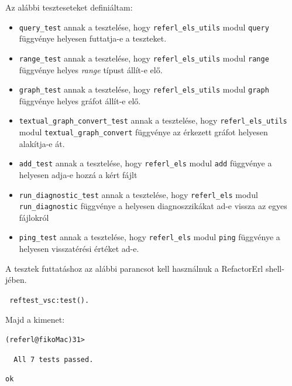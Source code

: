 \noindent Az alábbi teszteseteket definiáltam:

\begin{itemize}
    \item \lstinline{query_test} annak a tesztelése, hogy \lstinline{referl_els_utils} modul \lstinline{query} függvénye helyesen futtatja-e a teszteket.
    
    \item \lstinline{range_test} annak a tesztelése, hogy \lstinline{referl_els_utils} modul \lstinline{range} függvénye helyes \textit{range} típust állít-e elő.
    
    \item \lstinline{graph_test} annak a tesztelése, hogy \lstinline{referl_els_utils} modul \lstinline{graph} függvénye helyes gráfot állít-e elő.
    
    \item \lstinline{textual_graph_convert_test} annak a tesztelése, hogy \lstinline{referl_els_utils} modul \lstinline{textual_graph_convert} függvénye az érkezett gráfot helyesen alakítja-e át.
    
    
    
    
    
    \item \lstinline{add_test} annak a tesztelése, hogy \lstinline{referl_els} modul \lstinline{add} függvénye a helyesen adja-e hozzá a kért fájlt
    
    \item \lstinline{run_diagnostic_test} annak a tesztelése, hogy \lstinline{referl_els} modul \lstinline{run_diagnostic} függvénye a helyesen diagnoszzikákat ad-e vissza az egyes fájlokról
    
    \item \lstinline{ping_test} annak a tesztelése, hogy \lstinline{referl_els} modul \lstinline{ping} függvénye a helyesen visszatérési értéket ad-e.
    
\end{itemize}


\noindent A tesztek futtatáshoz az alábbi parancsot kell használnuk a RefactorErl shell-jében.

\noindent \lstinline{ reftest_vsc:test(). } 

\noindent Majd a kimenet:

\noindent \lstinline{(referl@fikoMac)31> } 

\noindent \lstinline{  All 7 tests passed.} 

\noindent \lstinline{ok} 








